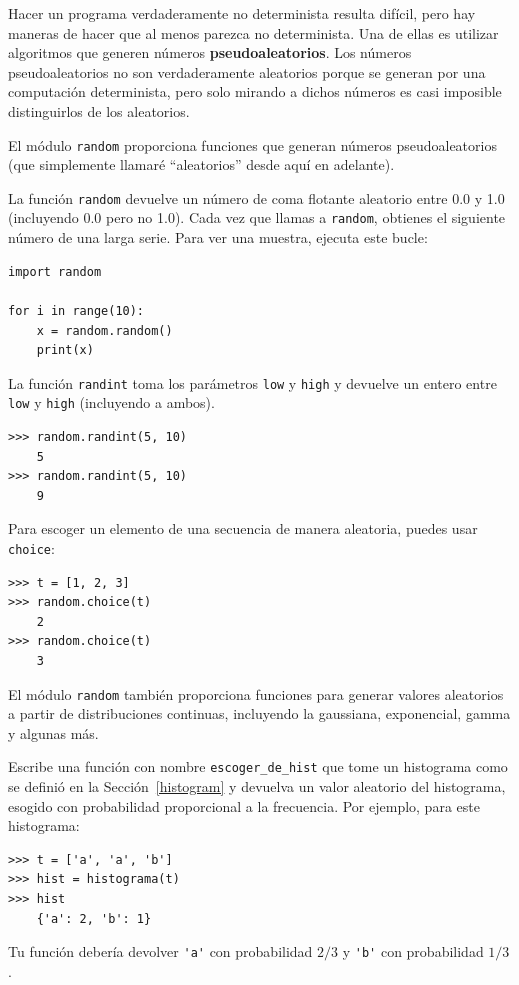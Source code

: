 \documentclass[10pt]{book}
\begin{document}
Hacer un programa verdaderamente no determinista resulta difícil,
pero hay maneras de hacer que al menos parezca no determinista.  Una de
ellas es utilizar algoritmos que generen números {\bf pseudoaleatorios}.
Los números pseudoaleatorios no son verdaderamente aleatorios porque se generan
por una computación determinista, pero solo mirando a dichos números
es casi imposible distinguirlos de los aleatorios.

El módulo {\tt random} proporciona funciones que generan
números pseudoaleatorios (que simplemente llamaré ``aleatorios'' desde
aquí en adelante).

La función {\tt random} devuelve un número de coma flotante aleatorio
entre 0.0 y 1.0 (incluyendo 0.0 pero no 1.0).  Cada vez que
llamas a {\tt random}, obtienes el siguiente número de una larga serie.
Para ver una muestra, ejecuta este bucle:

\begin{verbatim}
import random

for i in range(10):
    x = random.random()
    print(x)
\end{verbatim}
%
La función {\tt randint} toma los parámetros {\tt low} y
{\tt high} y devuelve un entero entre {\tt low} y
{\tt high} (incluyendo a ambos).

\begin{verbatim}
>>> random.randint(5, 10)
    5
>>> random.randint(5, 10)
    9
\end{verbatim}
%
Para escoger un elemento de una secuencia de manera aleatoria, puedes usar
{\tt choice}:

\begin{verbatim}
>>> t = [1, 2, 3]
>>> random.choice(t)
    2
>>> random.choice(t)
    3
\end{verbatim}
%
El módulo {\tt random} también proporciona funciones para generar
valores aleatorios a partir de distribuciones continuas, incluyendo
la gaussiana, exponencial, gamma y algunas más.

\begin{exercise}

Escribe una función con nombre \verb"escoger_de_hist" que tome
un histograma como se definió en la Sección~\ref{histogram} y devuelva un
valor aleatorio del histograma, esogido con probabilidad
proporcional a la frecuencia.  Por ejemplo, para este histograma:

\begin{verbatim}
>>> t = ['a', 'a', 'b']
>>> hist = histograma(t)
>>> hist
    {'a': 2, 'b': 1}
\end{verbatim}
%
Tu función debería devolver \verb"'a'" con probabilidad $2/3$ y \verb"'b'"
con probabilidad $1/3$.
\end{exercise}
\end{document}
